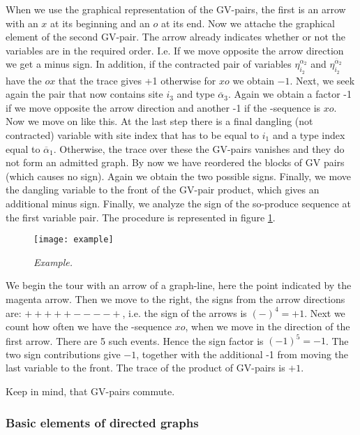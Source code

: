 When we use the graphical representation of the GV-pairs, the first is an arrow with an $x$
at its beginning and an $o$ at its end. Now we attache the graphical element of the second GV-pair. The arrow already indicates whether or not the variables are in the required order.
I.e. If we move opposite the arrow direction we get a minus sign. In addition, if the contracted
pair of variables $\eta_{i_{2}}^{\alpha_{2}}$ and $\eta_{i_{2}}^{\overline \alpha_{2}}$
have the \modes $ox$ that the trace gives +1 otherwise for $xo$ we obtain $-1$.
Next, we seek again the pair that now contains site
$i_{3}$ and type $\overline \alpha_{3}$.
Again we obtain a factor -1 if we move opposite the arrow direction and another -1 if the \mode-sequence is $xo$.
Now we move on like this. 
At the last step there is a final dangling (not contracted) variable with site index that has to be equal to $i_{1}$ and a type index equal to $\overline \alpha_{1}$. Otherwise,
the trace   over these the GV-pairs vanishes and they do not form an admitted graph.
By now we have reordered  the blocks of GV pairs (which causes no sign).
Again we obtain the two possible signs. Finally, we move the dangling variable to the front
of the GV-pair product, which gives an additional minus sign. Finally, we analyze the sign of the so-produce \mode sequence at the first variable pair.
%
The procedure is represented in figure \ref{fig:example}.
\begin{figure}[h]
\begin{center}
\texttt{[image: example]}
\caption{{\it Example.\label{fig:example}}}
\end{center}
\end{figure}
%
We begin the tour with an  arrow of a graph-line, here the point indicated by the magenta arrow. 
Then we move to the right, the signs from the arrow directions are:
$+++++----+$, i.e. the sign of the arrows is $(-)^{4}=+1$. Next we count how often we have the \mode-sequence $xo$, when we move in the direction of the first arrow. There are 5 such 
events. Hence the sign factor is $(-1)^{5}=-1$. The two sign contributions give $-1$, together
with the additional -1 from moving the last variable to the front. The trace
of the product of GV-pairs is $+1$.


Keep in mind, that GV-pairs commute.


\clearpage 

\subsubsection{Basic elements of directed graphs}

